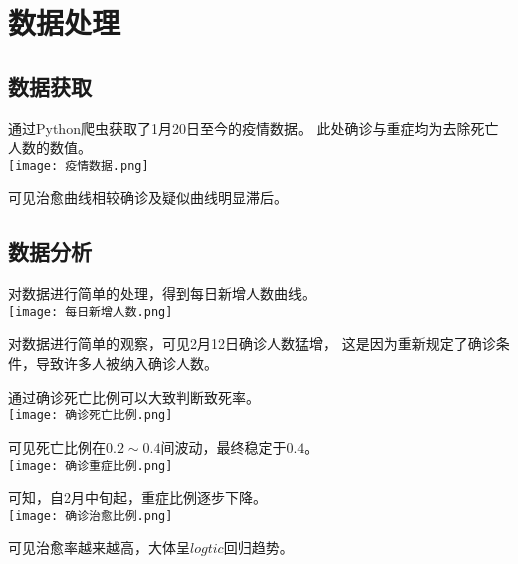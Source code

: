 \section{数据处理}
\subsection{数据获取}
通过Python爬虫获取了1月20日至今的疫情数据。
此处确诊与重症均为去除死亡人数的数值。
\\
\texttt{[image: 疫情数据.png]}
\par
可见治愈曲线相较确诊及疑似曲线明显滞后。
\subsection{数据分析}
对数据进行简单的处理，得到每日新增人数曲线。
\\
\texttt{[image: 每日新增人数.png]}
\par
对数据进行简单的观察，可见2月12日确诊人数猛增，
这是因为重新规定了确诊条件，导致许多人被纳入确诊人数。
\par
通过确诊死亡比例可以大致判断致死率。
\\
\texttt{[image: 确诊死亡比例.png]}
\par
可见死亡比例在$0.2\sim 0.4$间波动，最终稳定于$0.4$。
\\
\texttt{[image: 确诊重症比例.png]}
\par
可知，自2月中旬起，重症比例逐步下降。
\\
\texttt{[image: 确诊治愈比例.png]}
\par
可见治愈率越来越高，大体呈$logtic$回归趋势。

